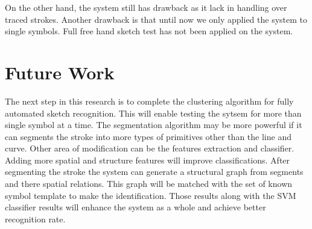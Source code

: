  On the other hand, the system still has drawback as it lack in handling over traced strokes.  Another drawback is that until now we only applied the system to single symbols.  Full free hand sketch test has not been applied on the system. %

\newpage

\section{Future Work}
\label{sec:FutureWork}


The next step in this research is to complete the clustering algorithm for fully automated sketch recognition. This will enable testing the sytsem for more than single symbol at a time. The segmentation algorithm may be more powerful if it can segments the stroke into more types of primitives other than the line and curve. Other area of modification can be the features extraction and classifier. Adding more spatial and structure features will improve classifications. After segmenting the stroke the system can generate a structural graph from segments and there spatial relations. This graph will be matched with the set of known symbol template to make the identification. Those results along with the SVM classifier results will enhance the system as a whole and achieve better recognition rate.  %
